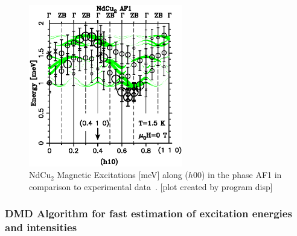 \begin{figure}[tb]%
\begin{center}\leavevmode
\includegraphics[angle=-0, width=0.6\textwidth]{figsrc/dispAF1.ps}
\end{center}
\caption{NdCu$_2$ Magnetic Excitations [meV] along ($h$00) in the phase AF1 in comparison to experimental %
data~\cite{rotter02-751}.
[plot created by program {\prg disp}]}
\end{figure}


\subsubsection{DMD Algorithm for fast estimation of excitation energies and intensities}
\label{intapprox}

